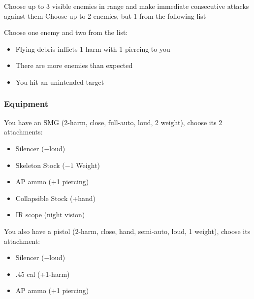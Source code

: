 {Choose up to 3 visible enemies in range and make immediate consecutive attacks against them}
{Choose up to 2 enemies, but 1 from the following list}
{Choose one enemy and two from the list:
\begin{itemize}
\item Flying debris inflicts 1-harm with 1 piercing to you
\item There are more enemies than expected
\item You hit an unintended target
\end{itemize}}


\subsubsection{Equipment}
You have an SMG (2-harm, close, full-auto, loud, 2 weight), choose its 2 attachments:
\begin{itemize}
\item Silencer ($-$loud)
\item Skeleton Stock ($-1$ Weight)
\item AP ammo (+1 piercing)
\item Collapsible Stock (+hand)
\item IR scope (night vision)
\end{itemize}

You also have a pistol (2-harm, close, hand, semi-auto, loud, 1 weight), choose its attachment:
\begin{itemize}
\item Silencer ($-$loud)
\item .45 cal (+1-harm)
\item AP ammo (+1 piercing)
\end{itemize}

